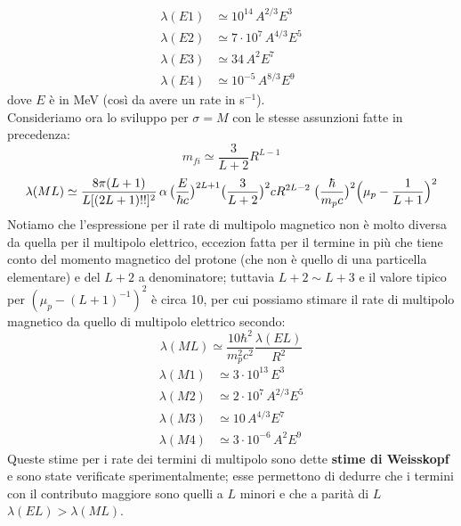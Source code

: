 \begin{displaymath}
\begin{aligned}
\lambda(E1)&\simeq 10^{14} \, A^{2/3} E^3 \\
\lambda(E2)&\simeq 7\cdot10^{7} \, A^{4/3} E^5 \\
\lambda(E3)&\simeq 34 \, A^{2} E^7 \\
\lambda(E4)&\simeq 10^{-5} \, A^{8/3} E^9
\end{aligned}
\end{displaymath}
dove $E$ è in MeV (così da avere un rate in s$^{-1}$).\\
Consideriamo ora lo sviluppo per $\sigma =M$ con le stesse assunzioni fatte in precedenza:
$$m_{fi}\simeq \frac{3}{L+2}R^{L-1}$$
$$\lambda(ML) \simeq \frac{8\pi(L+1)}{L[(2L+1)!!]^2}\,\alpha\,\bigl(\frac{E}{\hbar c} \bigr)^{2L+1}\bigl(\frac{3}{L+2} \bigr)^2cR^{2L-2}\;\bigl(\frac{\hbar}{m_p c}\bigr)^2\Bigl ( \mu_p - \frac{1}{L+1} \Bigr )^2$$
Notiamo che l'espressione per il rate di multipolo magnetico non è molto diversa da quella per il multipolo elettrico, eccezion fatta per il termine in più che tiene conto del momento magnetico del protone (che non è quello di una particella elementare) e del $L+2$ a denominatore; tuttavia $L+2\sim L+3$ e il valore tipico per $(\mu_p-(L+1)^{-1})^2$ è circa 10, per cui possiamo stimare il rate di multipolo magnetico da quello di multipolo elettrico secondo:
$$\lambda (ML)\simeq \frac{10\hbar^2}{m_p^2c^2}\frac{\lambda(EL)}{R^2}$$
\begin{displaymath}
\begin{aligned}
\lambda(M1)&\simeq 3\cdot10^{13} \,  E^3 \\
\lambda(M2)&\simeq 2\cdot10^{7} \, A^{2/3} E^5 \\
\lambda(M3)&\simeq 10 \, A^{4/3} E^7 \\
\lambda(M4)&\simeq 3\cdot10^{-6} \, A^{2} E^9
\end{aligned}
\end{displaymath}
Queste stime per i rate dei termini di multipolo sono dette \textbf{stime di Weisskopf}\label{sec-stime-Weiss} e sono state verificate sperimentalmente; esse permettono di dedurre che i termini con il contributo maggiore sono quelli a $L$ minori e che a parità di $L$ $\lambda(EL)>\lambda(ML)$.

